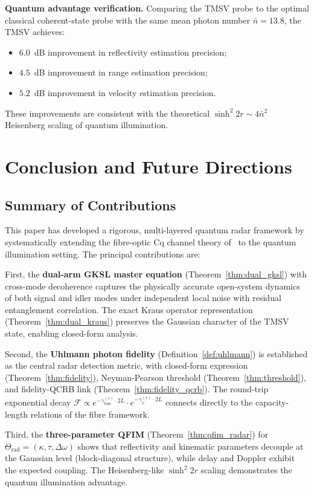 \documentclass[journal]{IEEEtran}
\begin{document}
\textbf{Quantum advantage verification.} Comparing the TMSV probe to the optimal classical coherent-state probe with the same mean photon number $\bar{n} = 13.8$, the TMSV achieves:
\begin{itemize}
    \item $6.0$~dB improvement in reflectivity estimation precision;
    \item $4.5$~dB improvement in range estimation precision;
    \item $5.2$~dB improvement in velocity estimation precision.
\end{itemize}
These improvements are consistent with the theoretical $\sinh^2 2r \sim 4\bar{n}^2$ Heisenberg scaling of quantum illumination.


\section{Conclusion and Future Directions}\label{sec:conclusion}

\subsection{Summary of Contributions}

This paper has developed a rigorous, multi-layered quantum radar framework by systematically extending the fibre-optic Cq channel theory of~\cite{gautum2024rigorous} to the quantum illumination setting. The principal contributions are:

First, the \textbf{dual-arm GKSL master equation} (Theorem~\ref{thm:dual_gksl}) with cross-mode decoherence captures the physically accurate open-system dynamics of both signal and idler modes under independent local noise with residual entanglement correlation. The exact Kraus operator representation (Theorem~\ref{thm:dual_kraus}) preserves the Gaussian character of the TMSV state, enabling closed-form analysis.

Second, the \textbf{Uhlmann photon fidelity} (Definition~\ref{def:uhlmann}) is established as the central radar detection metric, with closed-form expression (Theorem~\ref{thm:fidelity}), Neyman-Pearson threshold (Theorem~\ref{thm:threshold}), and fidelity-QCRB link (Theorem~\ref{thm:fidelity_qcrb}). The round-trip exponential decay $\mathcal{F} \propto e^{-\gamma_{\text{loss}}^{(s)} \cdot 2L} \cdot e^{-\gamma_\varphi^{(s)} \cdot 2L}$ connects directly to the capacity-length relations of the fibre framework.

Third, the \textbf{three-parameter QFIM} (Theorem~\ref{thm:qfim_radar}) for $\Theta_{\text{rad}} = (\kappa, \tau, \Delta\omega)$ shows that reflectivity and kinematic parameters decouple at the Gaussian level (block-diagonal structure), while delay and Doppler exhibit the expected coupling. The Heisenberg-like $\sinh^2 2r$ scaling demonstrates the quantum illumination advantage.
\end{document}
